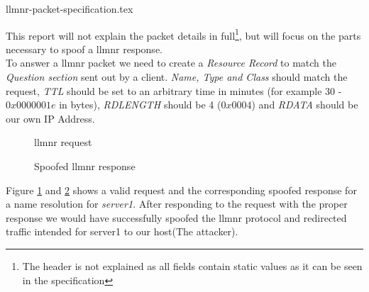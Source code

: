 \documentclass{article}
\begin{document}
{llmnr-packet-specification.tex}

This report will not explain the packet details in full\footnote{The header is not explained as all fields contain static values as it can be seen in the specification\cite{url:rfc:llmnr}}, but will focus on the parts necessary to spoof a \gls{llmnr} response.\\
To answer a \gls{llmnr} packet we need to create a \emph{Resource Record} to match the \emph{Question section} sent out by a client. \emph{Name, Type and Class} should match the request, \emph{TTL} should be set to an arbitrary time in minutes (for example 30 - $0x0000001e$ in bytes), \emph{RDLENGTH} should be 4 ($0x0004$) and \emph{RDATA} should be our own IP Address.

\begin{figure}[H]
	\scriptsize
	\par
	\centering
	\varwidth{\linewidth}
	
	\endvarwidth
    \par
    
    \caption{\gls{llmnr} request}
    \label{fig:llmnr-request}
\end{figure}

\begin{figure}[H]
	\scriptsize
	\par
	\centering
	\varwidth{\linewidth}
	
	\endvarwidth
    \par
    
    \caption{Spoofed \gls{llmnr} response}
    \label{fig:llmnr-response}
\end{figure}

Figure \ref{fig:llmnr-request} and \ref{fig:llmnr-response} shows a valid request and the corresponding spoofed response for a name resolution for \emph{server1}. After responding to the request with the proper response we would have successfully spoofed the \gls{llmnr} protocol and redirected traffic intended for server1 to our host(The attacker).
\end{document}

